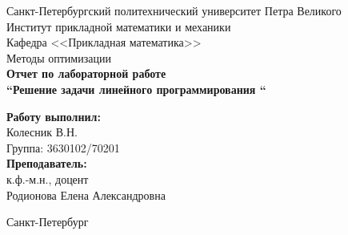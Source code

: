 \begin{titlepage}	%

	\begin{center}		%

		\large Санкт-Петербургский политехнический университет Петра Великого\\
		\large Институт прикладной математики и механики \\
		\large Кафедра <<Прикладная математика>>\\[6cm]
		
		\huge Методы оптимизации\\[0.5cm] %
		\large \textbf{Отчет по лабораторной работе \\``Решение задачи линейного программирования ``}\\[5.1cm]

	\end{center}


	\begin{flushright} %
		\begin{minipage}{0.25\textwidth} %
			\begin{flushleft} %

				\large\textbf{Работу выполнил:}\\
				\large Колесник В.Н.\\
				\large {Группа:} 3630102/70201\\
				
				\large \textbf{Преподаватель:}\\
				\large к.ф.-м.н., доцент\\
				\large Родионова Елена Александровна

			\end{flushleft}
		\end{minipage}
	\end{flushright}
	
	\vfill %

	\begin{center}
	\large Санкт-Петербург\\
	\large \the\year %
	\end{center} %

\end{titlepage} %

\vfill %
